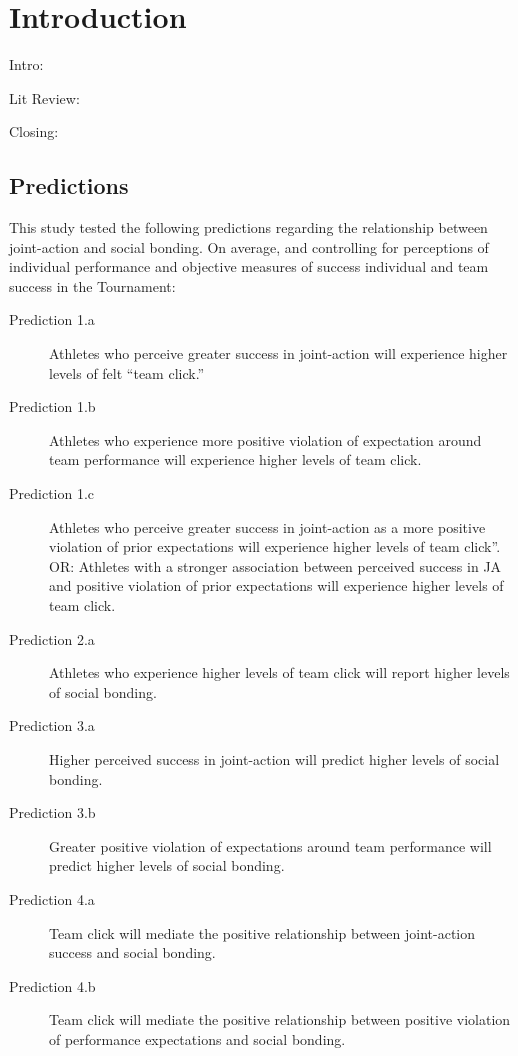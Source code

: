 \section{Introduction}

Intro:


Lit Review:


Closing:





\subsection{Predictions}
This study tested the following predictions regarding the relationship between joint-action and social bonding.  On average, and controlling for perceptions of individual performance and objective measures of success individual and team success in the Tournament:
\begin{indent}
\begin{description}
  \item [Prediction 1.a] Athletes who perceive greater success in joint-action will experience higher levels of felt  ``team click.''
  \item [Prediction 1.b] Athletes who experience more positive violation of expectation around team performance will experience higher levels of team click.
  \item [Prediction 1.c] Athletes who perceive greater success in joint-action as a more positive violation of prior expectations will experience higher levels of team click”.
  OR: Athletes with a stronger association between perceived success in JA and positive violation of prior expectations will experience higher levels of team click.  \\

  \item [Prediction 2.a] Athletes who experience higher levels of team click will report higher levels of social bonding.
  \bigskip
  \item [Prediction 3.a] Higher perceived success in joint-action will predict higher levels of social bonding.
 \item [Prediction 3.b] Greater positive violation of expectations around team performance will predict higher levels of social bonding.
  \item [Prediction 4.a] Team click will mediate the positive relationship between joint-action success and social bonding.
  \item [Prediction 4.b] Team click will mediate the positive relationship between positive violation of performance expectations and social bonding.
\end{description}
\end{indent}







